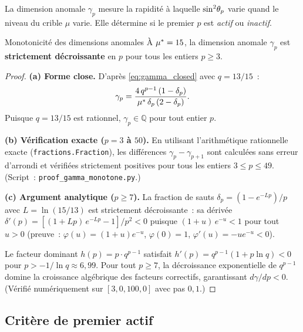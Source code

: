 \documentclass[12pt,a4paper]{article}
\begin{document}
La dimension anomale $\gamma_p$ mesure la rapidité à laquelle
$\sin^2\!\theta_{p}$ varie quand le niveau du crible $\mu$ varie. Elle
détermine si le premier $p$ est \emph{actif} ou \emph{inactif}.

\begin{thmbox}{Monotonicité des dimensions anomales}
\label{thm:gamma_monotone}
À ${\mu^{*}} = 15$, la dimension anomale $\gamma_p$ est
\textbf{strictement décroissante} en $p$ pour tous les entiers
$p \geq 3$.

\begin{proof}
\textbf{(a) Forme close.}
D'après \cref{eq:gamma_closed} avec $q = 13/15$~:
\begin{equation}
  \gamma_p = \frac{4\,q^{p-1}\,(1 - \delta_p)}{{\mu^{*}}\,\delta_p\,(2 - \delta_p)}.
  \label{eq:gamma_closed}
\end{equation}
Puisque $q = 13/15$ est rationnel, $\gamma_p \in \mathbb{Q}$ pour tout
entier $p$.

\textbf{(b) Vérification exacte ($p = 3$ à $50$).}
En utilisant l'arithmétique rationnelle exacte
(\texttt{fractions.Fraction}), les différences
$\gamma_p - \gamma_{p+1}$ sont calculées sans erreur d'arrondi et
vérifiées strictement positives pour tous les entiers
$3 \leq p \leq 49$. (Script~:
\texttt{proof\_gamma\_monotone.py}.)

\textbf{(c) Argument analytique ($p \geq 7$).}
La fraction de sauts $\delta_p = (1 - e^{-Lp})/p$ avec
$L = \ln(15/13)$ est strictement décroissante~: sa dérivée
$\delta'(p) = [(1 + Lp)\,e^{-Lp} - 1]/p^2 < 0$
puisque $(1 + u)\,e^{-u} < 1$ pour tout $u > 0$
(preuve~: $\varphi(u) = (1+u)e^{-u}$, $\varphi(0) = 1$,
$\varphi'(u) = -ue^{-u} < 0$).

Le facteur dominant $h(p) = p \cdot q^{p-1}$ satisfait
$h'(p) = q^{p-1}(1 + p\ln q) < 0$ pour
$p > -1/\ln q \approx 6{,}99$.
Pour tout $p \geq 7$, la décroissance exponentielle de $q^{p-1}$
domine la croissance algébrique des facteurs correctifs, garantissant
$d\gamma/dp < 0$. (Vérifié numériquement sur $[3{,}0, 100{,}0]$
avec pas $0{,}1$.)
\end{proof}
\end{thmbox}

\subsection{Critère de premier actif}
\label{sec:active_primes}
\end{document}
